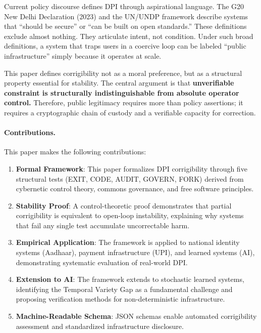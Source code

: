 \documentclass{article}
\begin{document}
Current policy discourse defines DPI through aspirational language. The G20 New Delhi Declaration (2023) and the UN/UNDP framework \citep{undp} describe systems that ``should be secure'' or ``can be built on open standards.'' These definitions exclude almost nothing. They articulate intent, not condition. Under such broad definitions, a system that traps users in a coercive loop can be labeled ``public infrastructure'' simply because it operates at scale.

This paper defines corrigibility not as a moral preference, but as a structural property essential for stability. The central argument is that \textbf{unverifiable constraint is structurally indistinguishable from absolute operator control.} Therefore, public legitimacy requires more than policy assertions; it requires a cryptographic chain of custody and a verifiable capacity for correction.

\paragraph{Contributions.} This paper makes the following contributions:
\begin{enumerate}[noitemsep]
    \item \textbf{Formal Framework}: This paper formalizes DPI corrigibility through five structural tests (EXIT, CODE, AUDIT, GOVERN, FORK) derived from cybernetic control theory, commons governance, and free software principles.
    \item \textbf{Stability Proof}: A control-theoretic proof demonstrates that partial corrigibility is equivalent to open-loop instability, explaining why systems that fail any single test accumulate uncorrectable harm.
    \item \textbf{Empirical Application}: The framework is applied to national identity systems (Aadhaar), payment infrastructure (UPI), and learned systems (AI), demonstrating systematic evaluation of real-world DPI.
    \item \textbf{Extension to AI}: The framework extends to stochastic learned systems, identifying the Temporal Variety Gap as a fundamental challenge and proposing verification methods for non-deterministic infrastructure.
    \item \textbf{Machine-Readable Schema}: JSON schemas enable automated corrigibility assessment and standardized infrastructure disclosure.
\end{enumerate}
\end{document}
